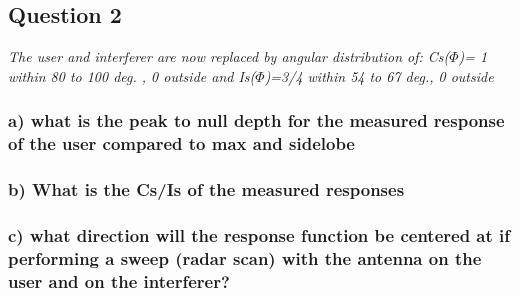 \subsection{Question 2}
\textit{The user and interferer are now replaced by angular distribution of: Cs($\Phi$)= 1 within 80 to 100 deg. , 0 outside and Is($\Phi$)=3/4 within 54 to 67 deg., 0 outside}

\subsubsection{a) what is the peak to null depth for the measured response of the user compared to max and sidelobe}


\subsubsection{b) What is the Cs/Is of the measured responses}

\subsubsection{c) what direction will the response function be centered at if performing a sweep (radar scan) with the antenna on the user and on the interferer?}